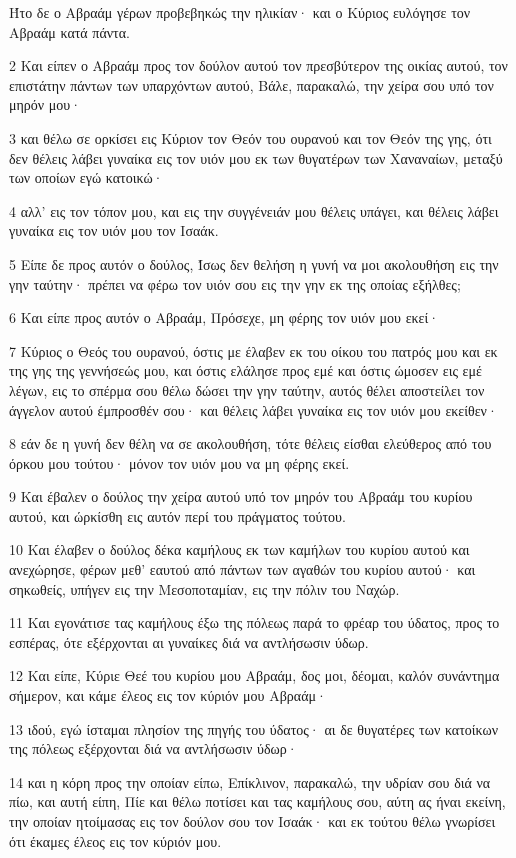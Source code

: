 \par Ήτο δε ο Αβραάμ γέρων προβεβηκώς την ηλικίαν· και ο Κύριος ευλόγησε τον Αβραάμ κατά πάντα.
\par 2 Και είπεν ο Αβραάμ προς τον δούλον αυτού τον πρεσβύτερον της οικίας αυτού, τον επιστάτην πάντων των υπαρχόντων αυτού, Βάλε, παρακαλώ, την χείρα σου υπό τον μηρόν μου·
\par 3 και θέλω σε ορκίσει εις Κύριον τον Θεόν του ουρανού και τον Θεόν της γης, ότι δεν θέλεις λάβει γυναίκα εις τον υιόν μου εκ των θυγατέρων των Χαναναίων, μεταξύ των οποίων εγώ κατοικώ·
\par 4 αλλ' εις τον τόπον μου, και εις την συγγένειάν μου θέλεις υπάγει, και θέλεις λάβει γυναίκα εις τον υιόν μου τον Ισαάκ.
\par 5 Είπε δε προς αυτόν ο δούλος, Ίσως δεν θελήση η γυνή να μοι ακολουθήση εις την γην ταύτην· πρέπει να φέρω τον υιόν σου εις την γην εκ της οποίας εξήλθες;
\par 6 Και είπε προς αυτόν ο Αβραάμ, Πρόσεχε, μη φέρης τον υιόν μου εκεί·
\par 7 Κύριος ο Θεός του ουρανού, όστις με έλαβεν εκ του οίκου του πατρός μου και εκ της γης της γεννήσεώς μου, και όστις ελάλησε προς εμέ και όστις ώμοσεν εις εμέ λέγων, εις το σπέρμα σου θέλω δώσει την γην ταύτην, αυτός θέλει αποστείλει τον άγγελον αυτού έμπροσθέν σου· και θέλεις λάβει γυναίκα εις τον υιόν μου εκείθεν·
\par 8 εάν δε η γυνή δεν θέλη να σε ακολουθήση, τότε θέλεις είσθαι ελεύθερος από του όρκου μου τούτου· μόνον τον υιόν μου να μη φέρης εκεί.
\par 9 Και έβαλεν ο δούλος την χείρα αυτού υπό τον μηρόν του Αβραάμ του κυρίου αυτού, και ώρκίσθη εις αυτόν περί του πράγματος τούτου.
\par 10 Και έλαβεν ο δούλος δέκα καμήλους εκ των καμήλων του κυρίου αυτού και ανεχώρησε, φέρων μεθ' εαυτού από πάντων των αγαθών του κυρίου αυτού· και σηκωθείς, υπήγεν εις την Μεσοποταμίαν, εις την πόλιν του Ναχώρ.
\par 11 Και εγονάτισε τας καμήλους έξω της πόλεως παρά το φρέαρ του ύδατος, προς το εσπέρας, ότε εξέρχονται αι γυναίκες διά να αντλήσωσιν ύδωρ.
\par 12 Και είπε, Κύριε Θεέ του κυρίου μου Αβραάμ, δος μοι, δέομαι, καλόν συνάντημα σήμερον, και κάμε έλεος εις τον κύριόν μου Αβραάμ·
\par 13 ιδού, εγώ ίσταμαι πλησίον της πηγής του ύδατος· αι δε θυγατέρες των κατοίκων της πόλεως εξέρχονται διά να αντλήσωσιν ύδωρ·
\par 14 και η κόρη προς την οποίαν είπω, Επίκλινον, παρακαλώ, την υδρίαν σου διά να πίω, και αυτή είπη, Πίε και θέλω ποτίσει και τας καμήλους σου, αύτη ας ήναι εκείνη, την οποίαν ητοίμασας εις τον δούλον σου τον Ισαάκ· και εκ τούτου θέλω γνωρίσει ότι έκαμες έλεος εις τον κύριόν μου.
